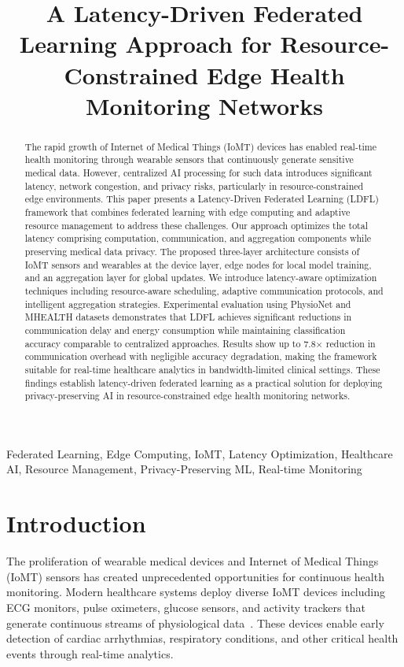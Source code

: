 \documentclass[10pt,conference]{IEEEtran}
\title{A Latency-Driven Federated Learning Approach for Resource-Constrained Edge Health Monitoring Networks}
\author{\IEEEauthorblockN{Sandhya Pathak}
\IEEEauthorblockA{\textit{Research Scholar}\\
\textit{Apex University}\\
Jaipur, India \\
sandhya.pathak@apexuniversity.edu}
}
\begin{document}
\maketitle

\begin{abstract}
The rapid growth of Internet of Medical Things (IoMT) devices has enabled real-time health monitoring through wearable sensors that continuously generate sensitive medical data. However, centralized AI processing for such data introduces significant latency, network congestion, and privacy risks, particularly in resource-constrained edge environments. This paper presents a Latency-Driven Federated Learning (LDFL) framework that combines federated learning with edge computing and adaptive resource management to address these challenges. Our approach optimizes the total latency comprising computation, communication, and aggregation components while preserving medical data privacy. The proposed three-layer architecture consists of IoMT sensors and wearables at the device layer, edge nodes for local model training, and an aggregation layer for global updates. We introduce latency-aware optimization techniques including resource-aware scheduling, adaptive communication protocols, and intelligent aggregation strategies. Experimental evaluation using PhysioNet and MHEALTH datasets demonstrates that LDFL achieves significant reductions in communication delay and energy consumption while maintaining classification accuracy comparable to centralized approaches. Results show up to 7.8$\times$ reduction in communication overhead with negligible accuracy degradation, making the framework suitable for real-time healthcare analytics in bandwidth-limited clinical settings. These findings establish latency-driven federated learning as a practical solution for deploying privacy-preserving AI in resource-constrained edge health monitoring networks.
\end{abstract}

\begin{IEEEkeywords}
Federated Learning, Edge Computing, IoMT, Latency Optimization, Healthcare AI, Resource Management, Privacy-Preserving ML, Real-time Monitoring
\end{IEEEkeywords}

\section{Introduction}
\label{sec:introduction}

The proliferation of wearable medical devices and Internet of Medical Things (IoMT) sensors has created unprecedented opportunities for continuous health monitoring. Modern healthcare systems deploy diverse IoMT devices including ECG monitors, pulse oximeters, glucose sensors, and activity trackers that generate continuous streams of physiological data~\cite{rajpurkar2022ai}. These devices enable early detection of cardiac arrhythmias, respiratory conditions, and other critical health events through real-time analytics.
\end{document}
